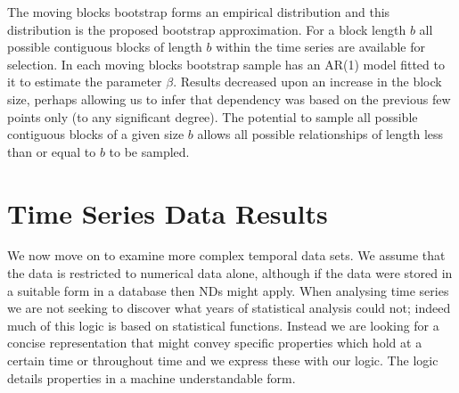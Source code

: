 \smallskip

\centerline{}
 
The moving blocks bootstrap forms an empirical distribution and this
distribution is the proposed bootstrap approximation. For a block
length $b$ all possible contiguous blocks of length $b$ within the
time series are available for selection. In \cite{et93} each moving
blocks bootstrap sample has an AR(1) model fitted to it to estimate
the parameter $\beta$. Results decreased upon an increase in the block
size, perhaps allowing us to infer that dependency was based on the
previous few points only (to any significant degree). The potential to
sample all possible contiguous blocks of a given size $b$ allows all
possible relationships of length less than or equal to $b$ to be sampled.



\section{Time Series Data Results}\label{sec:tr_tsares}



We now move on to examine more complex temporal data sets. We 
assume that the data is restricted to numerical data alone, although
if the data were stored in a suitable form in a database then NDs
might apply. When analysing time series we are not seeking to
discover what years of statistical analysis could not; indeed much of
this logic is based on statistical functions. Instead we are looking
for a concise representation that might convey specific properties
which hold at a certain time or throughout time and we express these
with our logic. The logic details properties in a machine
understandable form. 

\medskip

